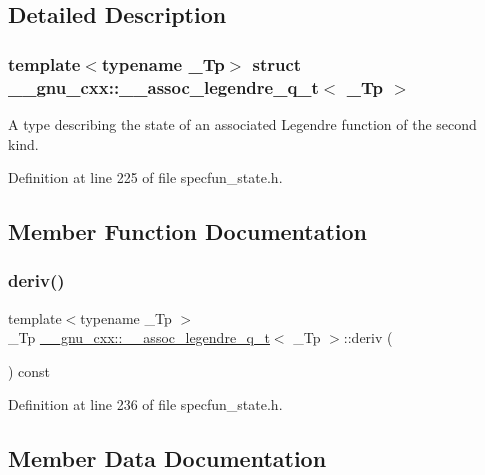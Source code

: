 \subsection{Detailed Description}
\subsubsection*{template$<$typename \+\_\+\+Tp$>$\newline
struct \+\_\+\+\_\+gnu\+\_\+cxx\+::\+\_\+\+\_\+assoc\+\_\+legendre\+\_\+q\+\_\+t$<$ \+\_\+\+Tp $>$}

A type describing the state of an associated Legendre function of the second kind. 

Definition at line 225 of file specfun\+\_\+state.\+h.



\subsection{Member Function Documentation}
\mbox{\label{struct____gnu__cxx_1_1____assoc__legendre__q__t_a4c888580c659eaafe8dfc4eda957a516}} 
\subsubsection{\texorpdfstring{deriv()}{deriv()}}
{\footnotesize\ttfamily template$<$typename \+\_\+\+Tp $>$ \\
\+\_\+\+Tp \hyperlink{struct____gnu__cxx_1_1____assoc__legendre__q__t}{\+\_\+\+\_\+gnu\+\_\+cxx\+::\+\_\+\+\_\+assoc\+\_\+legendre\+\_\+q\+\_\+t}$<$ \+\_\+\+Tp $>$\+::deriv (\begin{DoxyParamCaption}{ }\end{DoxyParamCaption}) const\hspace{0.3cm}{\ttfamily [inline]}}



Definition at line 236 of file specfun\+\_\+state.\+h.



\subsection{Member Data Documentation}
\mbox{\label{struct____gnu__cxx_1_1____assoc__legendre__q__t_ae1e0ac49983366eedefaa69c47761653}} 
